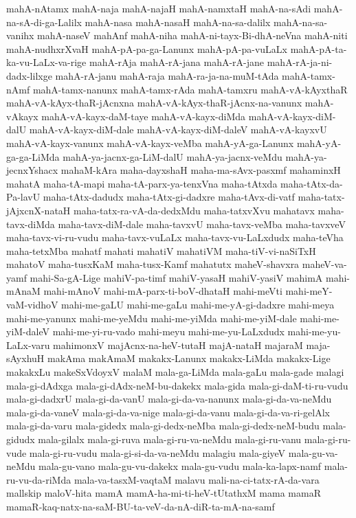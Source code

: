 {mahA-nAtamx
mahA-naja
mahA-najaH
mahA-namxtaH
mahA-na-sAdi
mahA-na-sA-di-ga-Lalilx
mahA-nasa
mahA-nasaH
mahA-na-sa-dalilx
mahA-na-sa-vanihx
mahA-naseV
mahAnf
mahA-niha
mahA-ni-tayx-Bi-dhA-neVna
mahA-niti
mahA-nudhxrXvaH
mahA-pA-pa-ga-Lanunx
mahA-pA-pa-vuLaLx
mahA-pA-ta-ka-vu-LaLx-va-rige
mahA-rAja
mahA-rA-jana
mahA-rA-jane
mahA-rA-ja-ni-dadx-lilxge
mahA-rA-janu
mahA-raja
mahA-ra-ja-na-muM-tAda
mahA-tamx-nAmf
mahA-tamx-nanunx
mahA-tamx-rAda
mahA-tamxru
mahA-vA-kAyxthaR
mahA-vA-kAyx-thaR-jAcnxna
mahA-vA-kAyx-thaR-jAcnx-na-vanunx
mahA-vAkayx
mahA-vA-kayx-daM-taye
mahA-vA-kayx-diMda
mahA-vA-kayx-diM-dalU
mahA-vA-kayx-diM-dale
mahA-vA-kayx-diM-daleV
mahA-vA-kayxvU
mahA-vA-kayx-vanunx
mahA-vA-kayx-veMba
mahA-yA-ga-Lanunx
mahA-yA-ga-ga-LiMda
mahA-ya-jacnx-ga-LiM-dalU
mahA-ya-jacnx-veMdu
mahA-ya-jecnxYshacx
mahaM-kAra
maha-dayxshaH
maha-ma-sAvx-pasxmf
mahaminxH
mahatA
maha-tA-mapi
maha-tA-parx-ya-tenxVna
maha-tAtxda
maha-tAtx-da-Pa-lavU
maha-tAtx-dadudx
maha-tAtx-gi-dadxre
maha-tAvx-di-vatf
maha-tatx-jAjxcnX-nataH
maha-tatx-ra-vA-da-dedxMdu
maha-tatxvXvu
mahatavx
maha-tavx-diMda
maha-tavx-diM-dale
maha-tavxvU
maha-tavx-veMba
maha-tavxveV
maha-tavx-vi-ru-vudu
maha-tavx-vuLaLx
maha-tavx-vu-LaLxdudx
maha-teVha
maha-tetxMba
mahatf
mahati
mahatiV
mahatiVM
maha-tiV-vi-naSiTxH
mahatoV
maha-tusxKaM
maha-tusx-Kamf
mahatutx
maheV-shavxra
maheV-va-yamf
mahi-Sa-gA-Lige
mahiV-pa-timf
mahiV-yasaH
mahiV-yasiV
mahimA
mahi-mAnaM
mahi-mAnoV
mahi-mA-parx-ti-boV-dhataH
mahi-meVti
mahi-meY-vaM-vidhoV
mahi-me-gaLU
mahi-me-gaLu
mahi-me-yA-gi-dadxre
mahi-meya
mahi-me-yanunx
mahi-me-yeMdu
mahi-me-yiMda
mahi-me-yiM-dale
mahi-me-yiM-daleV
mahi-me-yi-ru-vado
mahi-meyu
mahi-me-yu-LaLxdudx
mahi-me-yu-LaLx-varu
mahimonxV
majAcnx-na-heV-tutaH
majA-nataH
majaraM
maja-sAyxhuH
makAma
makAmaM
makakx-Lanunx
makakx-LiMda
makakx-Lige
makakxLu
makeSxVdoyxV
malaM
mala-ga-LiMda
mala-gaLu
mala-gade
malagi
mala-gi-dAdxga
mala-gi-dAdx-neM-bu-dakekx
mala-gida
mala-gi-daM-ti-ru-vudu
mala-gi-dadxrU
mala-gi-da-vanU
mala-gi-da-va-nanunx
mala-gi-da-va-neMdu
mala-gi-da-vaneV
mala-gi-da-va-nige
mala-gi-da-vanu
mala-gi-da-va-ri-gelAlx
mala-gi-da-varu
mala-gidedx
mala-gi-dedx-neMba
mala-gi-dedx-neM-budu
mala-gidudx
mala-gilalx
mala-gi-ruva
mala-gi-ru-va-neMdu
mala-gi-ru-vanu
mala-gi-ru-vude
mala-gi-ru-vudu
mala-gi-si-da-va-neMdu
malagiu
mala-giyeV
mala-gu-va-neMdu
mala-gu-vano
mala-gu-vu-dakekx
mala-gu-vudu
mala-ka-lapx-namf
mala-ru-vu-da-riMda
mala-va-tasxM-vaqtaM
malavu
mali-na-ci-tatx-rA-da-vara
mallskip
maloV-hita
mamA
mamA-ha-mi-ti-heV-tUtathxM
mama
mamaR
mamaR-kaq-natx-na-saM-BU-ta-veV-da-nA-diR-ta-mA-na-samf
}
